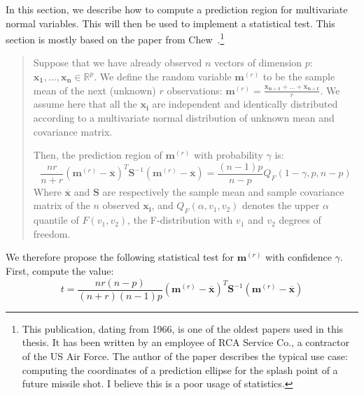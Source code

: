             In this section, we describe how to compute a prediction region for multivariate normal variables. This will
            then be used to implement a statistical test.  This section is mostly based on the paper from
            Chew~\cite[Section~4.4]{chew}.\footnote{This publication, dating from 1966, is one of the oldest papers used in this
            thesis. It has been written by an employee of RCA Service Co., a contractor of the US Air Force. The
            author of the paper describes the typical use case: computing the coordinates of a prediction ellipse
            for the splash point of a future missile shot. I believe this is a poor usage of statistics.}
            \begin{quote}
                Suppose that we have already observed \(n\) vectors of dimension \(p\): \(\bm{x_1},\dots,\bm{x_n} \in
                \mathbb{R}^p\). We define the random variable \(\bm{m}^{(r)}\) to be the sample mean of the next (unknown)
                \(r\) observations: \(\bm{m}^{(r)}= \frac{\bm{x_{n+1}}+\dots+\bm{x_{n+r}}}{r}\). We assume here that all the
                \(\bm{x_i}\) are independent and identically distributed according to a multivariate normal distribution
                of unknown mean and covariance matrix.

                Then, the prediction region of \(\bm{m}^{(r)}\) with probability \(\gamma\) is:
                \begin{equation}\label{eqn:experiment:non_regression:pred_region}
                    \frac{nr}{n+r} (\bm{m}^{(r)} - \overline{\bm{x}})^T \bm{S}^{-1}(\bm{m}^{(r)} -
                    \overline{\bm{x}})
                    =
                    \frac{(n-1)p}{n-p} Q_F(1-\gamma, p, n-p)
                \end{equation}
                Where \(\overline{\bm{x}}\) and \(\bm{S}\) are respectively the sample mean and sample covariance matrix of
                the \(n\) observed \(\bm{x_i}\), and \(Q_F(\alpha,v_1,v_2)\) denotes the upper \(\alpha\) quantile of
                \(F(v_1, v_2)\), the F-distribution with \(v_1\) and \(v_2\) degrees of freedom.
            \end{quote}

            We therefore propose the following statistical test for \(\bm{m}^{(r)}\) with confidence \(\gamma\). First,
            compute the value:
            \begin{equation}\label{eqn:experiment:non_regression:test}
                t = \frac{nr(n-p)}{(n+r)(n-1)p} (\bm{m}^{(r)} - \overline{\bm{x}})^T \bm{S}^{-1}(\bm{m}^{(r)} -
                \overline{\bm{x}})
            \end{equation}


